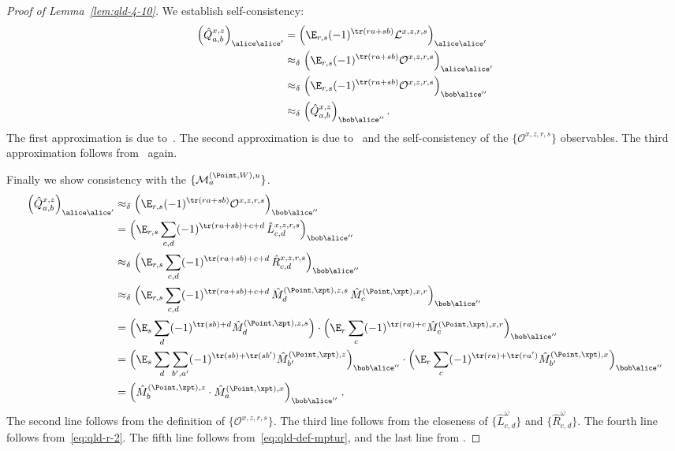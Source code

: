 \begin{proof}[Proof of Lemma~\ref{lem:qld-4-10}]
	We establish self-consistency:
	\begin{align*}
		\Big( \hat{Q}^{x,z}_{a,b} \Big)_{\alice \alice'} &= \Big( \E_{r,s} (-1)^{\tr(ra + sb)} \mathcal{L}^{x,z,r,s} \Big)_{\alice \alice'} \\
		&\approx_\delta \Big( \E_{r,s} (-1)^{\tr(ra + sb)} \mathcal{O}^{x,z,r,s} \Big)_{\alice \alice'} \\
		&\approx_\delta \Big( \E_{r,s} (-1)^{\tr(ra + sb)} \mathcal{O}^{x,z,r,s} \Big)_{\bob \alice''} \\
		&\approx_\delta \Big( \hat{Q}^{x,z}_{a,b} \Big)_{\bob \alice''}\,.
	\end{align*}
	The first approximation is due to~. The second approximation is due to~ and the self-consistency of the $\{\mathcal{O}^{x,z,r,s}\}$ observables. The third approximation follows from~ again. 
	
	Finally we show consistency with the $\{ \mathcal{M}^{(\Point,W),u}_a\}$. 
	\begin{align*}
		\Big( \hat{Q}^{x,z}_{a,b} \Big)_{\alice \alice'}&\approx_\delta \Big( \E_{r,s} (-1)^{\tr(ra + sb)} \mathcal{O}^{x,z,r,s} \Big)_{\bob \alice''} \\
		&= \Big( \E_{r,s} \sum_{c,d} (-1)^{\tr(ra + sb) + c + d} \, \hat{L}^{x,z,r,s}_{c,d}  \Big)_{\bob \alice''} \\
		&\approx_\delta \Big( \E_{r,s} \sum_{c,d} (-1)^{\tr(ra + sb) + c + d} \, \hat{R}^{x,z,r,s}_{c,d}  \Big)_{\bob \alice''} \\
		&\approx_\delta \Big( \E_{r,s} \sum_{c,d} (-1)^{\tr(ra + sb) + c + d} \, \hat{M}^{(\Point,\zpt),z,s}_d \, \hat{M}^{(\Point,\xpt),x,r}_c \Big)_{\bob \alice''} \\
                                                                &= \Big ( \E_s \sum_d (-1)^{\tr(sb) + d} \hat{M}^{(\Point,\zpt),z,s}_d \Big) \cdot \Big (\E_r \sum_c (-1)^{\tr(ra) + c} \hat{M}^{(\Point,\xpt),x,r}_c  \Big)_{\bob \alice''} \\
                                                                &= \Big( \E_s \sum_d \sum_{b', a'}  (-1)^{\tr(sb) + \tr(sb')} \hat{M}^{(\Point, \zpt), z}_{b'} \Big)_{\bob \alice''} \cdot \Big( \E_r \sum_c (-1)^{\tr(ra) + \tr(r a')} \hat{M}^{(\Point, \xpt), x}_{b'} \Big)_{\bob \alice''} \\
		&= \Big ( \hat{M}^{(\Point,\zpt),z}_b \cdot \hat{M}^{(\Point,\xpt),x}_a \Big)_{\bob \alice''}\;.
	\end{align*}
	The second line follows from the definition of $\{ \mathcal{O}^{x,z,r,s} \}$. The third line follows from the closeness of $\{\hat{L}^\omega_{c,d}\}$ and $\{\hat{R}^\omega_{c,d} \}$. The fourth line follows from~\eqref{eq:qld-r-2}.  The fifth line follows from~\eqref{eq:qld-def-mptur}, and the last line from .


\end{proof}
